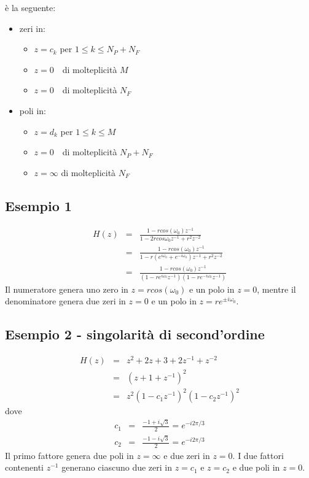 \`e la seguente:
\begin{itemize}
\item zeri in:
\begin{itemize}
\item $z=c_k$ \qquad per $1\leq k \leq N_P + N_F$
\item $z=0\textrm{ }$ \qquad di molteplicit\`a $M$
\item $z=0\textrm{ }$ \qquad di molteplicit\`a $N_F$
\end{itemize}
\item poli in:
\begin{itemize}
\item $z=d_k$ \qquad per $1\leq k \leq M$
\item $z=0\textrm{ }$ \qquad di molteplicit\`a $N_P + N_F$
\item $z=\infty$ \qquad di molteplicit\`a $N_F$
\end{itemize}
\end{itemize}

\subsection*{Esempio 1}
\begin{eqnarray*}
H(z) & = & \frac{1-rcos\left (\omega_0\right )z^{-1}}{1-2rcos{\omega_0}z^{-1}+r^2 z^{-2}} \\
     & = & \frac{1-rcos\left (\omega_0\right )z^{-1}}{1-r\left (e^{i\omega_0}+e^{-i\omega_0}\right )z^{-1}+r^2 z^{-2}} \\
     & = & \frac{1-rcos\left (\omega_0\right )z^{-1}}{\left (1-re^{i\omega_0}z^{-1}\right )\left (1-re^{-i\omega_0}z^{-1}\right )}
\end{eqnarray*}
Il numeratore genera uno zero in $z=rcos(\omega_0)$ e un polo in $z=0$, mentre il denominatore genera due zeri in $z=0$ e un polo in $z=re^{\pm i \omega_0}$.

\subsection*{Esempio 2 - singolarit\`a di second'ordine}
\begin{eqnarray*}
H(z) & = & z^2 + 2z + 3 + 2z^{-1} + z^{-2} \\
     & = & \left (z + 1 + z^{-1} \right )^2 \\
     & = & z^2 \left (1-c_1 z^{-1}\right )^2\left (1-c_2 z^{-1}\right )^2
\end{eqnarray*}
dove
\begin{eqnarray*}
c_1 & = & \frac{-1 + i\sqrt{3}}{2} = e^{-i2\pi/3} \\
c_2 & = & \frac{-1 - i\sqrt{3}}{2} = e^{-i2\pi/3}
\end{eqnarray*}
Il primo fattore genera due poli in $z=\infty$ e due zeri in $z=0$.
I due fattori contenenti $z^{-1}$ generano ciascuno due zeri in $z=c_1$ e $z=c_2$ e due poli in $z=0$.
